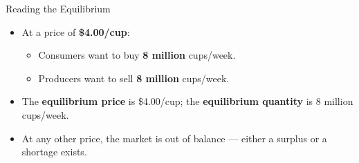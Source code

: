 \documentclass[aspectratio=169]{beamer}
\begin{document}
\begin{frame}{Reading the Equilibrium}
\transfade
\begin{itemize}
  \item At a price of \textbf{\$4.00/cup}:
  \begin{itemize}
    \item Consumers want to buy \textbf{8 million} cups/week.
    \item Producers want to sell \textbf{8 million} cups/week.
  \end{itemize}
  \item The \textbf{equilibrium price} is \$4.00/cup; the \textbf{equilibrium quantity} is 8 million cups/week.
  \item At any other price, the market is out of balance --- either a surplus or a shortage exists.
\end{itemize}
\end{frame}
\end{document}
